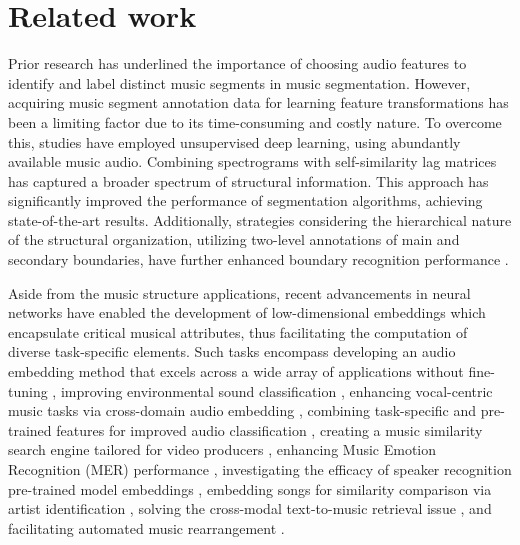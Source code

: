 \section{Related work}



Prior research has underlined the importance of choosing audio features to identify and label distinct music segments in music segmentation. However, acquiring music segment annotation data for learning feature transformations has been a limiting factor due to its time-consuming and costly nature. To overcome this, studies have employed unsupervised deep learning, using abundantly available music audio. Combining spectrograms with self-similarity lag matrices has captured a broader spectrum of structural information. This approach has significantly improved the performance of segmentation algorithms, achieving state-of-the-art results. Additionally, strategies considering the hierarchical nature of the structural organization, utilizing two-level annotations of main and secondary boundaries, have further enhanced boundary recognition performance \cite{unsupervisedlearndeepfeat, GrillMUSICANNOTATIONS, Hernandez-Olivan2021MusicFeatures, SalamonDeepSegmentation}.

Aside from the music structure applications, recent advancements in neural networks have enabled the development of low-dimensional embeddings which encapsulate critical musical attributes, thus facilitating the computation of diverse task-specific elements. Such tasks encompass developing an audio embedding method that excels across a wide array of applications without fine-tuning \cite{Turian2022HEAR:Representations}, improving environmental \cite{Kim2020OneStrategies} sound classification \cite{CramerLOOKEMBEDDINGS}, enhancing vocal-centric music tasks via cross-domain audio embedding \cite{Kim2021LearningLoss}, combining task-specific and pre-trained features for improved audio classification \cite{Hung2022Feature-informedClassification}, creating a music similarity search engine tailored for video producers \cite{epidemic}, enhancing Music Emotion Recognition (MER) performance \cite{KohComparisonRecognition}, investigating the efficacy of speaker recognition pre-trained model embeddings \cite{lightweight}, embedding songs for similarity comparison via artist identification \cite{contentmusicsimtriplet2020}, solving the cross-modal text-to-music retrieval issue \cite{WonEmotionStories}, and facilitating automated music rearrangement \cite{Stoller2018IntuitiveTransitions, Plachouras2023MusicSegmentation}.

